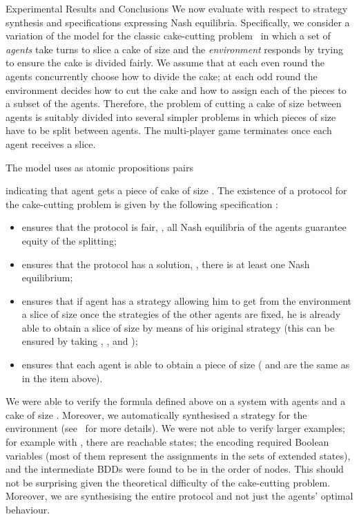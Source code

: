 \begin{section}{Experimental Results and Conclusions}
We now evaluate \MCMASSLK  with respect to strategy synthesis and specifications
expressing Nash equilibria.
Specifically, we consider a variation of the model for the classic cake-cutting
problem~\cite{ES84} in which a set of \emph{ agents} take turns to slice a
cake of size  and the \emph{environment} responds by trying to ensure the
cake is divided fairly.
We assume that at each even round the agents concurrently choose how to divide
the cake; at each odd round the environment decides how to cut the cake and how
to assign each of the pieces to a subset of the agents.
Therefore, the problem of cutting a cake of size  between  agents is
suitably divided into several simpler problems in which pieces of size 
have to be split between  agents.
The multi-player game terminates once each agent receives a slice.

The model uses as atomic propositions pairs

indicating that agent  gets a piece of cake of size .
The existence of a protocol for the cake-cutting problem is given by the
following \SL specification :

\begin{itemize}
\item
 ensures that the protocol  is fair, \ie, all Nash
equilibria  of the agents guarantee equity of
the splitting;
\item

ensures
that the protocol has a solution, \ie, there is at least one Nash equilibrium;
\item

ensures that if agent  has a strategy  allowing him to get from the
environment a slice of size  once the strategies of the other agents are
fixed, he is already able to obtain a slice of size  by means of his
original strategy  (this can be ensured by taking , , and );
\item
 ensures
that each agent  is able to obtain a piece of size  (
and  are the same as in the item above).
\end{itemize}
We were able to verify the formula  defined above on a system with  agents and a cake of size .
Moreover, we automatically synthesised a strategy  for the environment
(see~\cite{MCMASSLK} for more details).
We were not able to verify larger examples; for example with , there
are  reachable states; the encoding required  Boolean variables (most
of them represent the assignments in the sets of extended states), and the
intermediate BDDs were found to be in the order of  nodes.
This should not be surprising given the theoretical difficulty of the
cake-cutting problem.
Moreover, we are synthesising the entire protocol and not just the agents'
optimal behaviour.




\end{section}
